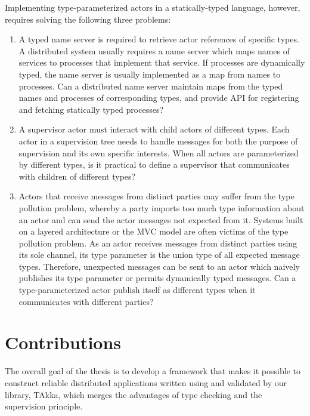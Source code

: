 Implementing type-parameterized actors in a statically-typed language, however, 
requires solving the following three problems:

\begin{enumerate}
  \item A typed name server is required to retrieve actor references of
specific types.  A distributed system usually requires a name server which
maps names of services to processes that implement that service.  If processes
are dynamically typed, the name server is usually implemented as a map from 
names to processes. Can a distributed name server maintain maps from the typed 
names and processes of corresponding types, and provide API for 
registering and fetching statically typed processes?

  \item A supervisor actor must interact with child actors of different types. 
Each actor in a supervision tree needs to handle messages for both the purpose 
of supervision and its own specific interests.  When all actors are 
parameterized by different types, is it practical to define a supervisor that 
communicates with children of different types?

  \item Actors that receive messages from distinct parties may suffer from the 
type pollution problem, whereby a party imports too much type information 
about an actor and can send the actor messages not expected from it. Systems 
built on a layered architecture or the MVC model are often victims of the type 
pollution problem. As an actor receives messages from distinct parties using its 
sole channel, its type parameter is the union type of all expected message 
types. Therefore, unexpected messages can be sent to an actor which naively 
publishes its type parameter or permits dynamically typed messages. Can a 
type-parameterized actor publish itself as different types when it communicates 
with different parties?
\end{enumerate}

\section{Contributions}

The overall goal of the thesis is to develop a framework that makes it possible 
to construct reliable distributed applications written using and validated by 
our library, TAkka, which merges the advantages of type checking and the 
supervision principle.   

